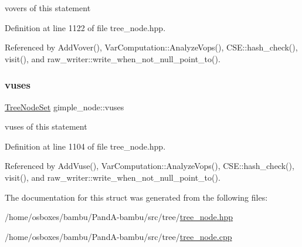 vovers of this statement 



Definition at line 1122 of file tree\+\_\+node.\+hpp.



Referenced by Add\+Vover(), Var\+Computation\+::\+Analyze\+Vops(), C\+S\+E\+::hash\+\_\+check(), visit(), and raw\+\_\+writer\+::write\+\_\+when\+\_\+not\+\_\+null\+\_\+point\+\_\+to().

\mbox{\label{structgimple__node_a8dab368ebcdedf9083741219ad63e12f}} 
\subsubsection{\texorpdfstring{vuses}{vuses}}
{\footnotesize\ttfamily \hyperlink{classTreeNodeSet}{Tree\+Node\+Set} gimple\+\_\+node\+::vuses}



vuses of this statement 



Definition at line 1104 of file tree\+\_\+node.\+hpp.



Referenced by Add\+Vuse(), Var\+Computation\+::\+Analyze\+Vops(), C\+S\+E\+::hash\+\_\+check(), visit(), and raw\+\_\+writer\+::write\+\_\+when\+\_\+not\+\_\+null\+\_\+point\+\_\+to().



The documentation for this struct was generated from the following files\+:\begin{DoxyCompactItemize}
\item 
/home/osboxes/bambu/\+Pand\+A-\/bambu/src/tree/\hyperlink{tree__node_8hpp}{tree\+\_\+node.\+hpp}\item 
/home/osboxes/bambu/\+Pand\+A-\/bambu/src/tree/\hyperlink{tree__node_8cpp}{tree\+\_\+node.\+cpp}\end{DoxyCompactItemize}
